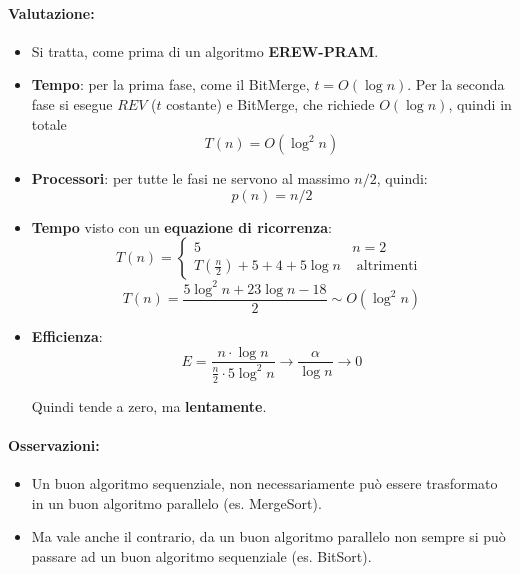 \documentclass[11pt]{article}
\begin{document}
	\paragraph{Valutazione: }
	\begin{itemize}
		\item Si tratta, come prima di un algoritmo \textbf{EREW-PRAM}.\\
		
		\item \textbf{Tempo}: per la prima fase, come il BitMerge, $t = O(\log n)$. Per la seconda fase si esegue $REV$ ($t$ costante) e BitMerge, che richiede $O(\log n)$, quindi in totale
		$$ T(n) = O (\log^2 n) $$
		\nn
		
		\item \textbf{Processori}: per tutte le fasi ne servono al massimo $n/2$, quindi:
		$$ p(n) = n/2 $$
		\nn
		
		\item \textbf{Tempo} visto con un \textbf{equazione di ricorrenza}: 
		$$ T(n) = \begin{cases}
			5 & n = 2 \\
			T(\frac{n}{2}) + 5 + 4 + 5 \log n& \text{ altrimenti }
		\end{cases}
		$$
		$$ T(n) = \frac{5 \log^2 n + 23 \log n - 18}{2} \sim O (\log^2 n) $$
		\nn
		
		\item \textbf{Efficienza}:
		$$ E = \frac{n \cdot  \log n}{\frac{n}{2} \cdot 5 \log^2 n} \rightarrow \frac{\alpha}{\log n} \rightarrow 0 $$
		
		Quindi tende a zero, ma \textbf{lentamente}.\\
	\end{itemize}
	
	
	\newpage
	
	\paragraph{Osservazioni: }
	\begin{itemize}
		\item Un buon algoritmo sequenziale, non necessariamente può essere trasformato in un buon algoritmo parallelo (es. MergeSort).\\
		
		\item Ma vale anche il contrario, da un buon algoritmo parallelo non sempre si può passare ad un buon algoritmo sequenziale (es. BitSort).\\
	\end{itemize}
	
\end{document}
